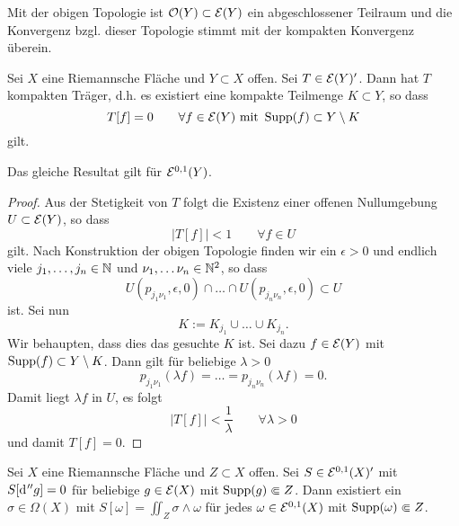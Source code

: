 \begin{cor}
  Mit der obigen Topologie ist $\mathcal{O}(Y) \subset \mathcal{E}(Y)$ ein
  abgeschlossener Teilraum und die Konvergenz bzgl. dieser Topologie
  stimmt mit der kompakten Konvergenz überein.
\end{cor}

\begin{lemma}
  \label{lemma:kompakter-träger-funktional}
  Sei $X$ eine Riemannsche Fläche und $Y \subset X$ offen. Sei $T \in
  \mathcal{E}(Y)'$. 
  Dann hat $T$ kompakten Träger, d.h. es existiert eine kompakte
  Teilmenge $K \subset Y$, so dass
  \[
  T[f] = 0 \qquad \forall f \in \mathcal{E}(Y) \text{ mit } \operatorname{Supp}(f) \subset
  Y \setminus K
  \]
  gilt.
  
  Das gleiche Resultat gilt für $\mathcal{E}^{0,1}(Y)$.
\end{lemma}

\begin{proof}
  Aus der Stetigkeit von $T$ folgt die Existenz einer offenen
  Nullumgebung \break$U \subset \mathcal{E}(Y)$, so dass
  \[
  |T[f]| < 1 \qquad \forall f \in U
  \]
  gilt. Nach Konstruktion der obigen Topologie finden wir ein $\epsilon > 0$
  und endlich viele $j_1, \dots, j_n \in \mathbb{N}$ und $\nu_1, \dots \nu_n
  \in \mathbb{N}^2$, so dass 
  \[
  U(p_{j_1\nu_1}, \epsilon, 0) \cap \dots \cap
  U(p_{j_n\nu_n}, \epsilon, 0) \subset U
  \]
  ist. Sei nun
  \[
  K := K_{j_1} \cup \dots \cup K_{j_n}.
  \]
  Wir behaupten, dass
  dies das gesuchte $K$ ist. 
  Sei dazu $f \in \mathcal{E}(Y)$ mit $\operatorname{Supp}(f) \subset Y \setminus
  K$. Dann gilt für beliebige
  $\lambda > 0$
  \[
  p_{j_1\nu_1}(\lambda f) = \dots = p_{j_n\nu_n}(\lambda f) = 0.
  \]
  Damit liegt $\lambda f$ in $U$, es folgt
  \[
  |T[f]| < \frac1\lambda \qquad \forall \lambda >0
  \]
  und damit $T[f] = 0$.
\end{proof}

\begin{lemma}
  \label{lemma:funktional-explizit}
  Sei $X$ eine Riemannsche Fläche und $Z \subset X$ offen. Sei $S \in
  \mathcal{E}^{0,1}(X)'$ mit $S[\d[''g]] = 0$ für beliebige $g \in \mathcal{E}(X)$
  mit $\operatorname{Supp}(g) \Subset Z$. 
  Dann existiert ein $\sigma \in \Omega(X)$ mit $S[\omega] = \iint_Z
  \sigma \wedge \omega$ für jedes $\omega \in \mathcal{E}^{0,1}(X)$ mit
  $\operatorname{Supp}(\omega) \Subset Z$.
\end{lemma}

